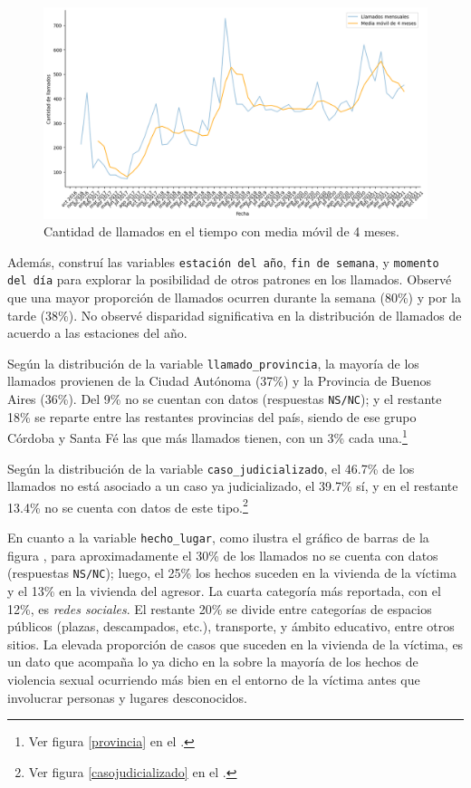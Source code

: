 \documentclass[10 pt]{article}
\begin{document}
\begin{figure}[H]
    \begin{center}
    \includegraphics[scale=.4]{images/latex_trend_llamados.png}
    \caption{Cantidad de llamados en el tiempo con media móvil de 4 meses.}
    \label{trend}
    \end{center}
    \end{figure}

Además, construí las variables \texttt{estación del año}, \texttt{fin de semana}, y \texttt{momento del día} para explorar la posibilidad de otros patrones en los llamados. Observé que una mayor proporción de llamados ocurren durante la semana (80\%) y por la tarde (38\%). No observé disparidad significativa en la distribución de llamados de acuerdo a las estaciones del año.


Según la distribución de la variable \texttt{llamado\_provincia}, la mayoría de los llamados provienen de la Ciudad Autónoma (37\%) y la Provincia de Buenos Aires (36\%). Del 9\% no se cuentan con datos (respuestas \texttt{NS/NC}); y el restante 18\% se reparte entre las restantes provincias del país, siendo de ese grupo Córdoba y Santa Fé las que más llamados tienen, con un 3\% cada una.\footnote{Ver figura \ref{provincia} en el .}

Según la distribución de la variable \texttt{caso\_judicializado}, el 46.7\% de los llamados no está asociado a un caso ya judicializado, el 39.7\% sí, y en el restante 13.4\% no se cuenta con datos de este tipo.\footnote{Ver figura \ref{casojudicializado} en el .} 

En cuanto a la variable \texttt{hecho\_lugar}, como ilustra el gráfico de barras de la figura , para aproximadamente el 30\% de los llamados no se cuenta con datos (respuestas \texttt{NS/NC}); luego, el 25\% los hechos suceden en la vivienda de la víctima y el 13\% en la vivienda del agresor. La cuarta categoría más reportada, con el 12\%, es \textit{redes sociales}. El restante 20\% se divide entre categorías de espacios públicos (plazas, descampados, etc.), transporte, y ámbito educativo, entre otros sitios. La elevada proporción de casos que suceden en la vivienda de la víctima, es un dato que acompaña lo ya dicho en la  sobre la mayoría de los hechos de violencia sexual ocurriendo más bien en el entorno de la víctima antes que involucrar personas y lugares desconocidos. 
\end{document}
